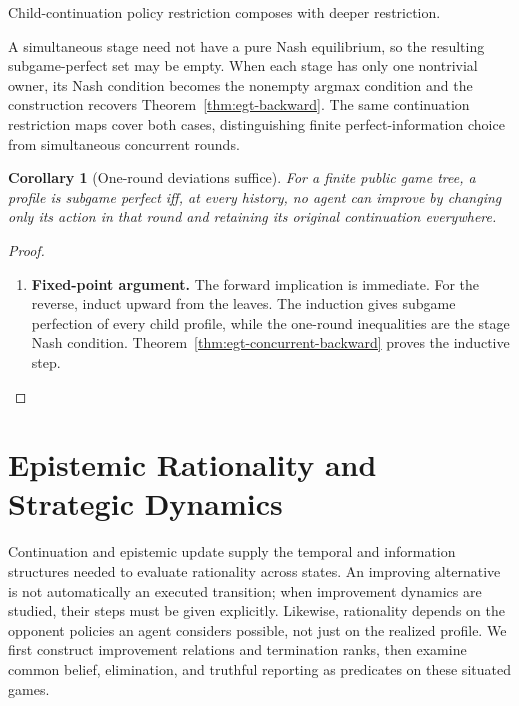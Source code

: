 \documentclass[11pt,a4paper]{article}
\numberwithin{equation}{section}
\newtheorem{corollary}[theorem]{Corollary}
\theoremstyle{definition}
\theoremstyle{remark}
\theoremstyle{plain}
\begin{document}
\noindent Child-continuation policy restriction composes with deeper restriction.
\begin{center}
\end{center}

A simultaneous stage need not have a pure Nash equilibrium, so
the resulting subgame-perfect set may be empty. When each stage has
only one nontrivial owner, its Nash condition becomes the nonempty
argmax condition and the construction recovers
Theorem~\ref{thm:egt-backward}. The same continuation restriction maps
cover both cases, distinguishing finite perfect-information choice
from simultaneous concurrent rounds.

\begin{corollary}[One-round deviations suffice]
For a finite public game tree, a profile is subgame perfect iff,
at every history, no agent can improve by changing only its action
in that round and retaining its original continuation everywhere.
\end{corollary}
\begin{proof}
\leavevmode
\begin{enumerate}[label=\textup{(\arabic*)},leftmargin=*,itemsep=4pt,topsep=3pt]
  \item \textbf{Fixed-point argument.} The forward implication is immediate. For the reverse, induct upward
from the leaves. The induction gives subgame perfection of every
child profile, while the one-round inequalities are the stage Nash
condition. Theorem~\ref{thm:egt-concurrent-backward} proves the
inductive step.
\end{enumerate}
\end{proof}

\section{Epistemic Rationality and Strategic Dynamics}\label{sec:paper-13}

Continuation and epistemic update supply the temporal and
information structures needed to evaluate rationality across states.
An improving alternative is not automatically an executed transition;
when improvement dynamics are studied, their steps must be given
explicitly. Likewise, rationality depends on the opponent policies an
agent considers possible, not just on the realized profile. We first
construct improvement relations and termination ranks, then examine
common belief, elimination, and truthful reporting as predicates on
these situated games.
\end{document}
